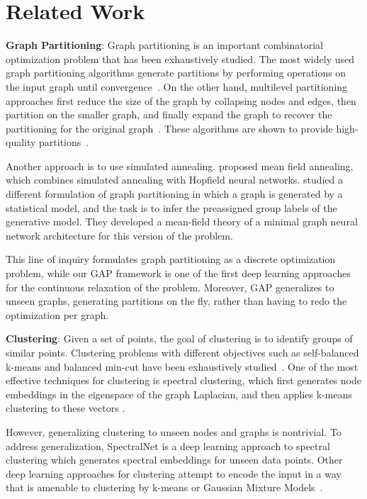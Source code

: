 \documentclass[10pt,twocolumn]{article}
\begin{document}
 \section{Related Work}
\label{sec:relWork}
\noindent\textbf{Graph Partitioning}:
Graph partitioning is an important combinatorial optimization problem that has been exhaustively studied. The most widely used graph partitioning algorithms generate partitions by performing operations on the input graph until convergence~\cite{andersen2006, chung2007gp}. On the other hand, multilevel partitioning approaches first reduce the size of the graph by collapsing nodes and edges, then partition on the smaller graph, and finally expand the graph to recover the partitioning for the original graph~\cite{karypis_2000, karypis_1999, karypis_1998, miettinen_2006}. These algorithms are shown to provide high-quality partitions~\cite{miettinen_2006}.


Another approach is to use simulated annealing. \cite{van_1990} proposed mean field annealing, which combines simulated annealing with Hopfield neural networks. \cite{kawamoto2018mean} studied a different formulation of graph partitioning in which a graph is generated by a statistical model, and the task is to infer the preassigned group labels of the generative model. They developed a mean-field theory of a minimal graph neural network architecture for this version of the problem.


This line of inquiry formulates graph partitioning as a discrete optimization problem, while our GAP framework is one of the first deep learning approaches for the continuous relaxation of the problem. Moreover, GAP generalizes to unseen graphs, generating partitions on the fly, rather than having to redo the optimization per graph.

\noindent\textbf{Clustering}:
Given a set of points, the goal of clustering is to identify groups of similar points. Clustering problems with different objectives such as self-balanced k-means and balanced min-cut have been exhaustively studied~\cite{liu_2017, chen_2017, chang_2014}. One of the most effective techniques for clustering is spectral clustering, which first generates node embeddings in the eigenspace of the graph Laplacian, and then applies k-means clustering to these vectors \cite{Shi_2000, ng2002spectral, von2007tutorial}.



However, generalizing clustering to unseen nodes and graphs is nontrivial. To address generalization, SpectralNet \cite{shaham2018spectralnet} is a deep learning approach to spectral clustering which generates spectral embeddings for unseen data points. Other deep learning approaches for clustering attempt to encode the input in a way that is amenable to clustering by k-means or Gaussian Mixture Models~\cite{yang2017, xie2016unsupervised, zheng2016variational, dilokthanakul2016deep}.
\end{document}

